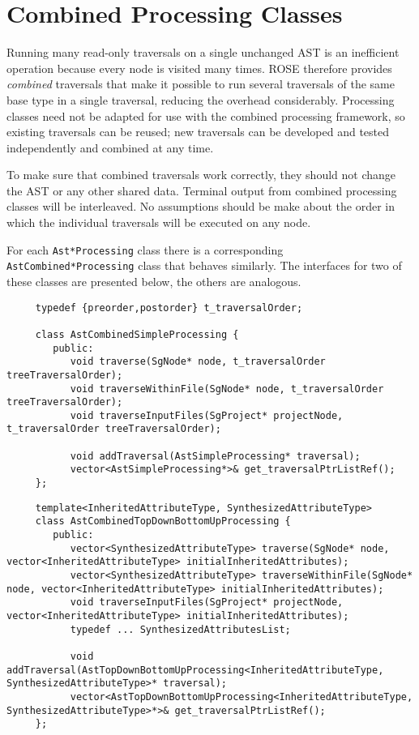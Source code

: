\section{Combined Processing Classes}

Running many read-only traversals on a single unchanged AST is an inefficient
operation because every node is visited many times. ROSE therefore provides
{\em combined} traversals that make it possible to run several traversals of
the same base type in a single traversal, reducing the overhead considerably.
Processing classes need not be adapted for use with the combined processing
framework, so existing traversals can be reused; new traversals can be
developed and tested independently and combined at any time.

To make sure that combined traversals work correctly, they should not change
the AST or any other shared data. Terminal output from combined processing
classes will be interleaved. No assumptions should be make about the order in
which the individual traversals will be executed on any node.

For each {\tt Ast*Processing} class there is a corresponding {\tt
AstCombined*Processing} class that behaves similarly. The interfaces for two
of these classes are presented below, the others are analogous.

{\indent
{\mySmallFontSize
\begin{verbatim}
     typedef {preorder,postorder} t_traversalOrder;

     class AstCombinedSimpleProcessing {
        public:
           void traverse(SgNode* node, t_traversalOrder treeTraversalOrder);
           void traverseWithinFile(SgNode* node, t_traversalOrder treeTraversalOrder);
           void traverseInputFiles(SgProject* projectNode, t_traversalOrder treeTraversalOrder);

           void addTraversal(AstSimpleProcessing* traversal);
           vector<AstSimpleProcessing*>& get_traversalPtrListRef();
     };
\end{verbatim}
}}

{\indent
{\mySmallFontSize
\begin{verbatim}
     template<InheritedAttributeType, SynthesizedAttributeType>
     class AstCombinedTopDownBottomUpProcessing {
        public:
           vector<SynthesizedAttributeType> traverse(SgNode* node, vector<InheritedAttributeType> initialInheritedAttributes);
           vector<SynthesizedAttributeType> traverseWithinFile(SgNode* node, vector<InheritedAttributeType> initialInheritedAttributes);
           void traverseInputFiles(SgProject* projectNode, vector<InheritedAttributeType> initialInheritedAttributes);
           typedef ... SynthesizedAttributesList;

           void addTraversal(AstTopDownBottomUpProcessing<InheritedAttributeType, SynthesizedAttributeType>* traversal);
           vector<AstTopDownBottomUpProcessing<InheritedAttributeType, SynthesizedAttributeType>*>& get_traversalPtrListRef();
     };
\end{verbatim}
}}

